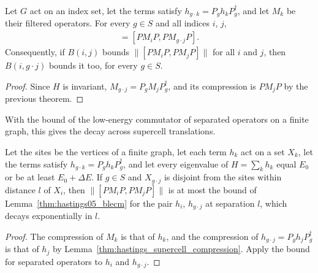 \begin{lemma}
    \label{thm:hastings_supercell_commutator}
    \leanok
    Let $G$ act on an index set, let the terms satisfy
    $h_{g\cdot k}=P_gh_kP_g^\dagger$, and let $M_k$ be their filtered operators.
    For every $g\in S$ and all indices $i$, $j$,
    \begin{align}
        [PM_iP,PM_jP]=[PM_iP,PM_{g\cdot j}P].
    \end{align}
    Consequently, if $B(i,j)$ bounds $\|[PM_iP,PM_jP]\|$ for all $i$ and $j$,
    then $B(i,g\cdot j)$ bounds it too, for every $g\in S$.
\end{lemma}
\begin{proof}\leanok
    Since $H$ is invariant, $M_{g\cdot j}=P_gM_jP_g^\dagger$, and its
    compression is $PM_jP$ by the previous theorem.
\end{proof}

With the bound of the low-energy commutator of separated operators on a finite
graph, this gives the decay across supercell translations.

\begin{lemma}
    \label{thm:hastings_supercell_decay}
    \leanok
    Let the sites be the vertices of a finite graph, let each term $h_k$ act on
    a set $X_k$, let the terms satisfy $h_{g\cdot k}=P_gh_kP_g^\dagger$, and let
    every eigenvalue of $H=\sum_kh_k$ equal $E_0$ or be at least $E_0+\Delta E$.
    If $g\in S$ and $X_{g\cdot j}$ is disjoint from the sites within distance $l$
    of $X_i$, then $\|[PM_iP,PM_jP]\|$ is at most the bound of
    Lemma~\ref{thm:hastings05_blecm} for the pair $h_i$, $h_{g\cdot j}$ at
    separation $l$, which decays exponentially in $l$.
\end{lemma}
\begin{proof}\leanok
    The compression of $M_k$ is that of $h_k$, and the compression of
    $h_{g\cdot j}=P_gh_jP_g^\dagger$ is that of $h_j$ by
    Lemma~\ref{thm:hastings_supercell_compression}. Apply the bound for
    separated operators to $h_i$ and $h_{g\cdot j}$.
\end{proof}

